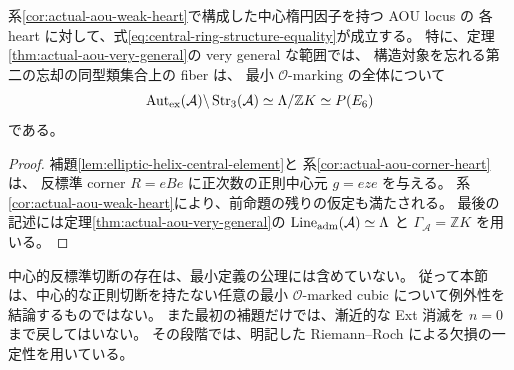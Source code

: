 \begin{corollary}
\label{cor:aou-all-structures-exceptional}
系\ref{cor:actual-aou-weak-heart}で構成した中心楕円因子を持つ AOU locus の
各 heart に対して、式\eqref{eq:central-ring-structure-equality}が成立する。
特に、定理\ref{thm:actual-aou-very-general}の very general な範囲では、
構造対象を忘れる第二の忘却の同型類集合上の fiber は、
最小 $\mathcal O$-marking の全体について
\[
 \operatorname{Aut}_{\rm ex}(\mathcal A)\backslash
 \operatorname{Str}_3(\mathcal A)
 \simeq\Lambda/\mathbb ZK\simeq P(E_6)
\]
である。
\end{corollary}
\begin{proof}
補題\ref{lem:elliptic-helix-central-element}と
系\ref{cor:actual-aou-corner-heart}は、
反標準 corner $R=eBe$ に正次数の正則中心元 $g=eze$ を与える。
系\ref{cor:actual-aou-weak-heart}により、前命題の残りの仮定も満たされる。
最後の記述には定理\ref{thm:actual-aou-very-general}の
$\operatorname{Line}_{\rm adm}(\mathcal A)\simeq\Lambda$ と
$\Gamma_{\mathcal A}=\mathbb ZK$ を用いる。
\end{proof}

中心的反標準切断の存在は、最小定義の公理には含めていない。
従って本節は、中心的な正則切断を持たない任意の最小
$\mathcal O$-marked cubic について例外性を結論するものではない。
また最初の補題だけでは、漸近的な Ext 消滅を $n=0$ まで戻してはいない。
その段階では、明記した Riemann--Roch による欠損の一定性を用いている。
